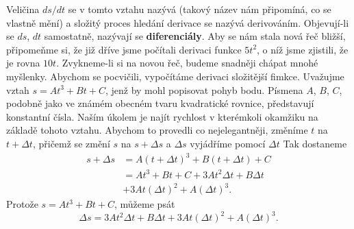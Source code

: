     Veličina \(ds/dt\) se v tomto vztahu nazývá  (takový název nám 
    připomíná, co se vlastně mění) a složitý proces hledání derivace se nazývá derivováním. 
    Objevují-li se \(ds\), \(dt\) samostatně, nazývají se \textbf{diferenciály}. Aby se nám stala 
    nová řeč bližší, připomeňme si, že již dříve jsme počítali derivaci funkce \(5t^2\), o níž jsme 
    zjistili, že je rovna \(10t\). Zvykneme-li si na novou řeč, budeme snadněji chápat mnohé 
    myšlenky. Abychom se pocvičili, vypočítáme derivaci složitější fimkce. Uvažujme vztah \(s = 
    At^3 + Bt+ C\), jenž by mohl popisovat pohyb bodu. Písmena \(A\), \(B\), \(C\), podobně jako ve 
    známém obecném tvaru kvadratické rovnice, představují konstantní čísla. Naším úkolem je najít 
    rychlost v kterémkoli okamžiku na základě tohoto vztahu. Abychom to provedli co nejelegantněji, 
    změníme \(t\) na \(t + \Delta t\), přičemž se změní \(s\) na \(s + \Delta s\) a \(\Delta s\) 
    vyjádříme pomocí \(\Delta t\) Tak dostaneme
    \begin{align}\label{fyz:eq119}
     s + \Delta s &= A(t + \Delta t)^3 + B(t + \Delta t) + C    \nonumber \\
                  &= At^3 + Bt + C + 3At^2\Delta t + B\Delta t  \nonumber \\
                  &+ 3At(\Delta t)^2 + A(\Delta t)^3.
    \end{align}
    Protože \(s = At^3 + Bt + C\), můžeme psát
    \begin{equation}\label{fyz:eq120}
         \Delta s = 3At^2\Delta t + B\Delta t + 3At(\Delta t)^2 + A(\Delta t)^3.
    \end{equation}

    \begin{table}      %
      \caption{Stručný přehled derivací: \(s\), \(u\), \(v\), \(w\) jsou libovolné funkce; \(t\), 
               \(a\), \(b\), \(c\), \(n\) jsou libovolné konstanty  
               (\cite[s.~114]{Feynman01})}
      \label{fyz:tab005}
    \end{table}
    
